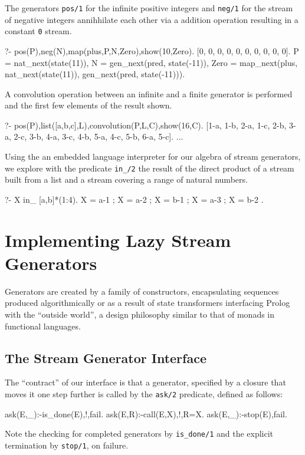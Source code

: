 \documentclass{new_tlp}
\begin{document}
\BX
The generators {\tt pos/1} for the infinite positive integers and {\tt neg/1} for
the stream of negative integers annihhilate each other via a addition operation
resulting in a constant {\tt 0} stream.
\begin{codex}
?- pos(P),neg(N),map(plus,P,N,Zero),show(10,Zero).
[0, 0, 0, 0, 0, 0, 0, 0, 0, 0].
P = nat_next(state(11)), N = gen_next(pred, state(-11)),
Zero = map_next(plus, nat_next(state(11)), gen_next(pred, state(-11))).
\end{codex}
\EX

\BX
A convolution operation between an infinite and a finite generator is performed
and the first few elements of the result shown.
\begin{codex}
?- pos(P),list([a,b,c],L),convolution(P,L,C),show(16,C).
[1-a, 1-b, 2-a, 1-c, 2-b, 3-a, 2-c, 3-b, 4-a, 3-c, 4-b, 5-a, 4-c, 5-b, 6-a, 5-c].
...
\end{codex}
\EX

\BX
Using the an embedded language interpreter for our algebra of stream
generators, we explore with the predicate {\tt in\_/2} 
the result of the direct product of a stream built
from a list and a stream covering a range of natural numbers.

\begin{codex}
?- X in_ [a,b]*(1:4).
X = a-1 ;
X = a-2 ;
X = b-1 ;
X = a-3 ;
X = b-2 .
\end{codex}
\EX  
     

\section{Implementing Lazy Stream Generators}
  
Generators are created by a family of constructors, encapsulating sequences produced algorithmically or as a result of state transformers interfacing Prolog with the ``outside world'', a design philosophy similar to that of monads in functional languages.

\subsection{The Stream Generator Interface}

The ``contract'' of our interface is that a generator, specified by a 
closure that moves it one step further is called by the {\tt ask/2} predicate, defined as follows:
\begin{code}
ask(E,_):-is_done(E),!,fail.
ask(E,R):-call(E,X),!,R=X.
ask(E,_):-stop(E),fail.
\end{code}
Note  the checking for completed generators by {\tt is\_done/1} and the explicit termination by {\tt stop/1}, on failure.
\end{document}
